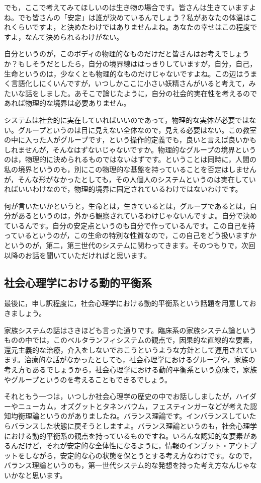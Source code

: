 \documentclass{ltjsbook}
\begin{document}
でも，ここで考えてみてほしいのは生き物の場合です。皆さんは生きていますよね。でも皆さんの「安定」は誰が決めているんでしょう？私があなたの体温はこれくらいですよ，と決めたわけではありませんよね。あなたの幸せはこの程度ですよ，なんて決められるわけがない。

自分というのが，このボディの物理的なものだけだと皆さんはお考えでしょうか？もしそうだとしたら，自分の境界線ははっきりしていますが，自分，自己，生命というのは，少なくとも物理的なものだけじゃないですよね。この辺はうまく言語化しにくいんですが，いつしかここに小さい妖精さんがいると考えて，みたいな話をしました。あそこで論じたように，自分の社会的実在性を考えるのであれば物理的な境界は必要ありません。

システムは社会的に実在していればいいのであって，物理的な実体が必要ではない。グループというのは目に見えない全体なので，見える必要はない。この教室の中に入った人がグループです，という操作的定義でも，良いと言えば良いかもしれませんが，そんなはずないじゃないですか。物理的なグループの境界というのは，物理的に決められるものではないはずです。ということは同時に，人間の私の境界というのも，別にこの物理的な基盤を持っていることを否定はしませんが，そんな形がなかったとしても，その人個人のシステムというのは実在していればいいわけなので，物理的境界に固定されているわけではないわけです。

何が言いたいかというと，生命とは，生きているとは，グループであるとは，自分があるというのは，外から観察されているわけじゃないんですよ。自分で決めているんです。自分の安定点というのも自分で作っているんです。この自己を持っているというのが，この生命の特別な性質なので，この自己をどう扱いますかというのが，第二，第三世代のシステムに関わってきます。そのつもりで，次回以降のお話を聞いていただければと思います。

\subsection{社会心理学における動的平衡系}
最後に，申し訳程度に，社会心理学における動的平衡系という話題を用意しておきましょう。

家族システムの話はさきほども言った通りです。臨床系の家族システム論というものの中では，このベルタランフィシステムの観点で，因果的な直線的な要素，還元主義的な治療，介入をしないでおこうというような方針として運用されています。治療的な話がなかったとしても，社会心理学におけるグループや，家族の考え方もあるでしょうから，社会心理学における動的平衡系という意味で，家族やグループというのを考えることもできるでしょう。

それともう一つは，いつしか社会心理学の歴史の中でお話ししましたが，ハイダーやニューカム，オズグットとタネンバウム，フェスティンガーなどが考えた認知均衡理論というのがありましたね。バランス理論です。インバランスしていたらバランスした状態に戻そうとしますよ。バランス理論というのも，社会心理学における動的平衡系の観点を持っているものですね。いろんな認知的な要素があるんだけど，それが安定的な全体性になるように，情報のインプット・アウトプットをしながら，安定的な心の状態を保とうとする考え方なわけです。なので，バランス理論というのも，第一世代システム的な発想を持った考え方なんじゃないかなと思います。
\end{document}
